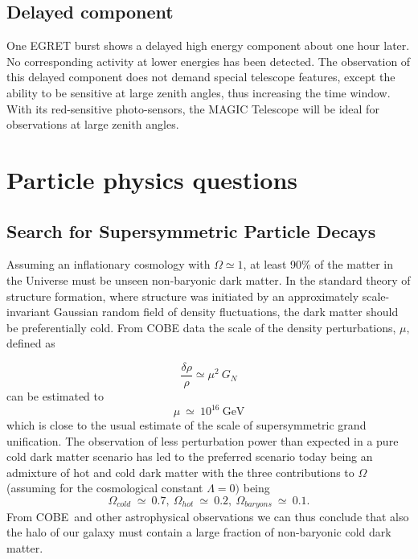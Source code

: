 \subsection{Delayed component}

\medskip One EGRET burst shows a delayed high energy component about one hour later.
No corresponding activity at lower energies has been detected. The
observation of this delayed component does not demand special telescope
features, except the ability to be sensitive at large zenith angles, thus
increasing the time window. With its red-sensitive photo-sensors,
the MAGIC Telescope will be ideal for observations at large zenith angles.

\section{Particle physics questions}

\subsection{Search for Supersymmetric Particle Decays}


\medskip Assuming an inflationary cosmology with $\Omega \simeq 1$, at least 90\% of
the matter in the Universe must be unseen non-baryonic dark matter. In the
standard theory of structure formation, where structure was initiated by an
approximately scale-invariant Gaussian random field of density fluctuations,
the dark matter should be preferentially cold. From COBE data the scale of
the density perturbations, $\mu ,$ defined as

\[
\frac{\delta \rho }{\rho }\simeq \mu ^{2}\ G_{N} 
\]
can be estimated to 
\[
\mu \ \simeq \ 10^{16}\ \mathrm{GeV} 
\]
which is close to the usual estimate of the scale of supersymmetric grand
unification. The observation of less perturbation power than expected in a
pure cold dark matter scenario has led to the preferred scenario today being
an admixture of hot and cold dark matter with the three contributions to $%
\Omega $ (assuming for the cosmological constant $\Lambda =0)$ being 
\[
\Omega _{cold_{{}}}\ \simeq \ 0.7,\  \Omega _{hot}\ \simeq\  0.2,\ \Omega
_{baryons}\ \simeq\  0.1. 
\]
From COBE\ and other astrophysical observations we can thus conclude that
also the halo of our galaxy must contain a large fraction of non-baryonic
cold dark matter.

